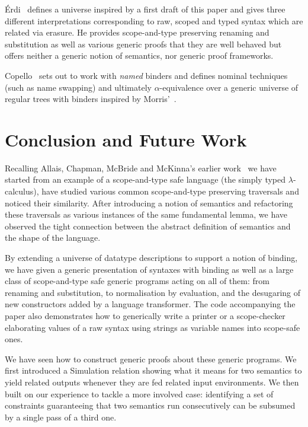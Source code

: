 Érdi~\citeyear{gergodraft} defines a universe inspired by a first draft of this
paper and gives three different interpretations corresponding to raw, scoped
and typed syntax which are related via erasure. He provides scope-and-type
preserving renaming and substitution as well as various generic proofs that
they are well behaved but offers neither a generic notion of semantics, nor
generic proof frameworks.

Copello~\citeyear{copello2017} sets out to work with \emph{named} binders and
defines nominal techniques (such as name swapping) and ultimately $\alpha$-equivalence
over a generic universe of regular trees with binders inspired by Morris'~\citeyear{morris-regulartt}.




\section{Conclusion and Future Work}

Recalling Allais, Chapman, McBride and McKinna's earlier work~\citeyear{allais2017type}
we have started from an example
of a scope-and-type safe language (the simply typed $\lambda$-calculus), have studied
various common scope-and-type preserving traversals and noticed their similarity.
After introducing a notion of semantics and refactoring these traversals as
various instances of the same fundamental lemma, we have observed the tight
connection between the abstract definition of semantics and the shape of the
language.

By extending a universe of datatype descriptions to support a notion of binding,
we have given a generic presentation of syntaxes with binding as well
as a large class of scope-and-type safe generic programs acting on all of them:
from renaming and substitution, to normalisation by evaluation, and the desugaring
of new constructors added by a language transformer. The code accompanying the
paper also demonstrates how to generically write a printer or a scope-checker
elaborating values of a raw syntax using strings as variable names into scope-safe
ones.

We have seen how to construct generic proofs about these generic programs. We
first introduced a Simulation relation showing what it means for two semantics
to yield related outputs whenever they are fed related input environments. We
then built on our experience to tackle a more involved case: identifying a set
of constraints guaranteeing that two semantics run consecutively can be subsumed
by a single pass of a third one.

